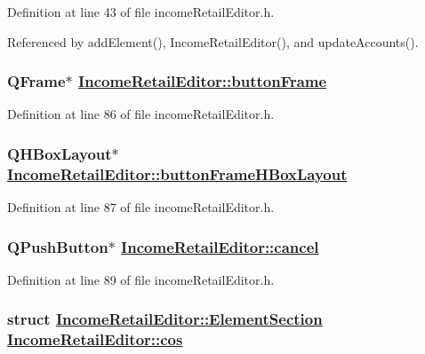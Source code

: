 Definition at line 43 of file income\-Retail\-Editor.h.

Referenced by add\-Element(), Income\-Retail\-Editor(), and update\-Accounts().\hypertarget{classIncomeRetailEditor_r29}{
\subsubsection[buttonFrame]{\setlength{\rightskip}{0pt plus 5cm}QFrame$\ast$ \hyperlink{classIncomeRetailEditor_r29}{Income\-Retail\-Editor::button\-Frame}}}
\label{classIncomeRetailEditor_r29}


Definition at line 86 of file income\-Retail\-Editor.h.\hypertarget{classIncomeRetailEditor_r30}{
\subsubsection[buttonFrameHBoxLayout]{\setlength{\rightskip}{0pt plus 5cm}QHBox\-Layout$\ast$ \hyperlink{classIncomeRetailEditor_r30}{Income\-Retail\-Editor::button\-Frame\-HBox\-Layout}}}
\label{classIncomeRetailEditor_r30}


Definition at line 87 of file income\-Retail\-Editor.h.\hypertarget{classIncomeRetailEditor_r32}{
\subsubsection[cancel]{\setlength{\rightskip}{0pt plus 5cm}QPush\-Button$\ast$ \hyperlink{classIncomeRetailEditor_r32}{Income\-Retail\-Editor::cancel}}}
\label{classIncomeRetailEditor_r32}


Definition at line 89 of file income\-Retail\-Editor.h.\hypertarget{classIncomeRetailEditor_r5}{
\subsubsection[cos]{\setlength{\rightskip}{0pt plus 5cm}struct \hyperlink{structIncomeRetailEditor_1_1ElementSection}{Income\-Retail\-Editor::Element\-Section}  \hyperlink{classIncomeRetailEditor_r5}{Income\-Retail\-Editor::cos}}}
\label{classIncomeRetailEditor_r5}




